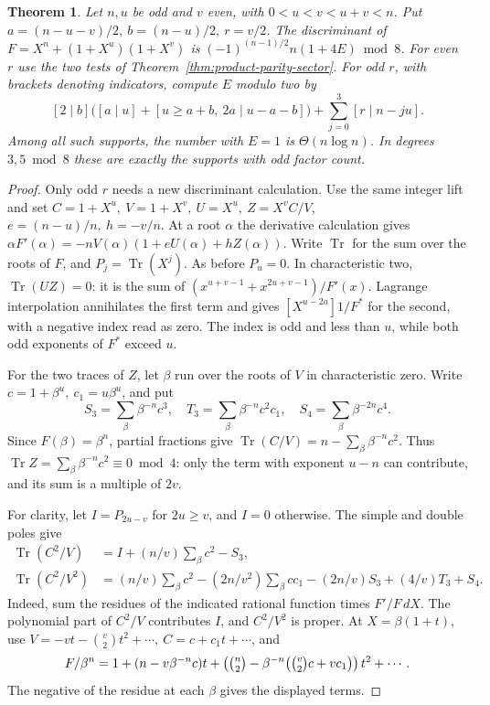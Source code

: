 \documentclass[11pt]{article}
\newtheorem{theorem}{Theorem}
\begin{document}
\begin{theorem}\label{thm:odd-smaller-tap}
Let \(n,u\) be odd and \(v\) even, with \(0<u<v<u+v<n\).
Put \(a=(n-u-v)/2,\ b=(n-u)/2,\ r=v/2\).
The discriminant of \(F=X^n+(1+X^u)(1+X^v)\) is
\((-1)^{(n-1)/2}n(1+4E)\bmod8\). For even \(r\) use the two tests of
Theorem~\ref{thm:product-parity-sector}. For odd \(r\), with brackets
denoting indicators, compute \(E\) modulo two by
\[
 [2\mid b]\bigl([a\mid u]+[u\ge a+b,\ 2a\mid u-a-b]\bigr)
     +\sum_{j=0}^3[r\mid n-ju] .
\]
Among all such supports, the number with \(E=1\) is
\(\Theta(n\log n)\). In degrees \(3,5\bmod8\) these are
exactly the supports with odd factor count.
\end{theorem}
\begin{proof}
Only odd \(r\) needs a new discriminant calculation. Use the same
integer lift and set \(C=1+X^u,\ V=1+X^v,\ U=X^u,\ Z=X^v C/V\),
\(e=(n-u)/n,\ h=-v/n\).
At a root \(\alpha\) the derivative calculation gives
\(\alpha F'(\alpha)=-nV(\alpha)(1+eU(\alpha)+hZ(\alpha))\).
Write \(\operatorname{Tr}\) for the sum over the roots of \(F\), and
\(P_j=\operatorname{Tr}(X^j)\). As before \(P_u=0\).
In characteristic two, \(\operatorname{Tr}(UZ)=0\): it is the sum
of \((x^{u+v-1}+x^{2u+v-1})/F'(x)\). Lagrange interpolation
annihilates the first term and gives \([X^{u-2a}]1/F^*\) for the
second, with a negative index read as zero. The index is odd and
less than \(u\), while both odd exponents of \(F^*\) exceed \(u\).

For the two traces of \(Z\), let \(\beta\) run over the roots of
\(V\) in characteristic zero. Write \(c=1+\beta^u,\ c_1=u\beta^u\), and put
\[
 S_3=\sum_\beta\beta^{-n}c^3,\quad
 T_3=\sum_\beta\beta^{-n}c^2c_1,\quad
 S_4=\sum_\beta\beta^{-2n}c^4 .
\]
Since \(F(\beta)=\beta^n\), partial fractions give
\(\operatorname{Tr}(C/V)=n-\sum_\beta\beta^{-n}c^2\).
Thus \(\operatorname{Tr}Z=\sum_\beta\beta^{-n}c^2\equiv0\bmod4\):
only the term with exponent \(u-n\) can contribute, and its sum is
a multiple of \(2v\).

For clarity, let \(I=P_{2u-v}\) for \(2u\ge v\), and \(I=0\)
otherwise. The simple and double poles give
\begin{align*}
 \operatorname{Tr}(C^2/V)&= I+(n/v)\sum_\beta c^2-S_3,\\
 \operatorname{Tr}(C^2/V^2)&=(n/v)\sum_\beta c^2
 -(2n/v^2)\sum_\beta cc_1-(2n/v)S_3+(4/v)T_3+S_4 .
\end{align*}
Indeed, sum the residues of the indicated rational function times
\(F'/F\,dX\). The polynomial part of \(C^2/V\) contributes \(I\),
and \(C^2/V^2\) is proper. At \(X=\beta(1+t)\), use
\(V=-vt-\binom v2t^2+\cdots,\ C=c+c_1t+\cdots\), and
\[
 F/\beta^n=1+(n-v\beta^{-n}c)t+
  \left(\tbinom n2-\beta^{-n}\bigl(\tbinom v2c+vc_1\bigr)\right)t^2+\cdots .
\]
The negative of the residue at each \(\beta\) gives the displayed terms.


\end{proof}
\end{document}
